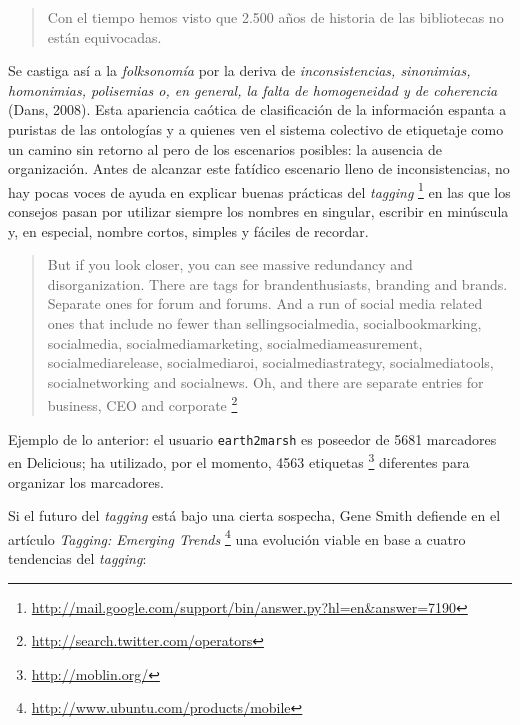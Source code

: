 \documentclass[12pt, a4paper,twoside]{book}
\begin{document}
\begin{quote}
Con el tiempo hemos visto que 2.500 años de historia de las
bibliotecas no están equivocadas.

\end{quote}
Se castiga así a la \emph{folksonomía} por la deriva de
\emph{inconsistencias, sinonimias, homonimias, polisemias o, en general, la falta de homogeneidad y de coherencia}
(Dans, 2008). Esta apariencia caótica de clasificación de la
información espanta a puristas de las ontologías y a quienes ven el
sistema colectivo de etiquetaje como un camino sin retorno al pero
de los escenarios posibles: la ausencia de organización. Antes de
alcanzar este fatídico escenario lleno de inconsistencias, no hay
pocas voces de ayuda en explicar buenas prácticas del
\emph{tagging}%
\footnote{\href{http://mail.google.com/support/bin/answer.py?hl=en&answer=7190}{http://mail.google.com/support/bin/answer.py?hl=en\&answer=7190}}
en las que los consejos pasan por utilizar siempre los nombres en
singular, escribir en minúscula y, en especial, nombre cortos,
simples y fáciles de recordar.

\begin{quote}
But if you look closer, you can see massive redundancy and
disorganization. There are tags for brandenthusiasts, branding and
brands. Separate ones for forum and forums. And a run of social
media related ones that include no fewer than sellingsocialmedia,
socialbookmarking, socialmedia, socialmediamarketing,
socialmediameasurement, socialmediarelease, socialmediaroi,
socialmediastrategy, socialmediatools, socialnetworking and
socialnews. Oh, and there are separate entries for business, CEO
and corporate%
\footnote{\href{http://search.twitter.com/operators}{http://search.twitter.com/operators}}

\end{quote}
Ejemplo de lo anterior: el usuario \verb!earth2marsh! es poseedor
de 5681 marcadores en Delicious; ha utilizado, por el momento, 4563
etiquetas%
\footnote{\href{http://moblin.org/}{http://moblin.org/}}
diferentes para organizar los marcadores.

Si el futuro del \emph{tagging} está bajo una cierta sospecha, Gene
Smith defiende en el artículo \emph{Tagging: Emerging Trends}%
\footnote{\href{http://www.ubuntu.com/products/mobile}{http://www.ubuntu.com/products/mobile}}
una evolución viable en base a cuatro tendencias del
\emph{tagging}:
\end{document}
